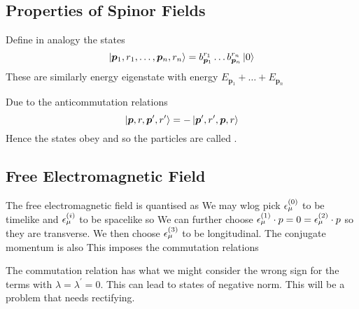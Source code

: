 \documentclass{article}
\begin{document}
\subsection{Properties of Spinor Fields}

\begin{definition}
Define in analogy the states 
\[
\ket{\bm{p}_1,r_1,\dots,\bm{p}_n,r_n} = b_{\bm{p}_1}^{r_1} \dots b_{\bm{p}_n}^{r_n} \ket{0}
\]
These are similarly energy eigenstate with energy $E_{\bm{p}_1}+\dots+E_{\bm{p}_n}$
\end{definition}

\begin{theorem}
Due to the anticommutation relations 
\[
\ket{\bm{p},r,\bm{p}^\prime,r^\prime}=-\ket{\bm{p}^\prime,r^\prime,\bm{p},r}
\]
Hence the states obey  and so the particles are called .  
\end{theorem}

\subsection{Free Electromagnetic Field}
The free electromagnetic field is quantised as 
We may wlog pick $\epsilon_\mu^{(0)}$ to be timelike and $\epsilon_\mu^{(i)}$ to be spacelike so 
\eq{
\eps^{(\lambda)} \cdot \eps_\mu^{(\lambda^\prime)} = \eta^{\lambda \lambda^\prime}
}
We can further choose $\epsilon_\mu^{(1)} \cdot p = 0 = \epsilon_\mu^{(2)} \cdot p$ so they are transverse. We then choose $\epsilon_\mu^{(3)}$ to be longitudinal. The conjugate momentum is also 
This imposes the commutation relations 

\begin{remark}
The commutation relation has what we might consider the wrong sign for the terms with $\lambda = \lambda^\prime = 0$. This can lead to states of negative norm. This will be a problem that needs rectifying. 
\end{remark}
\end{document}
